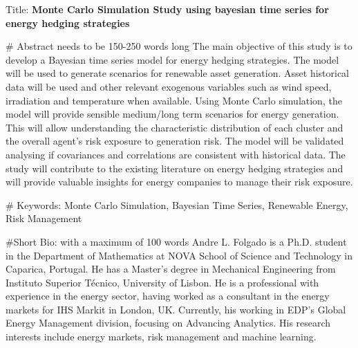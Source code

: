 \documentclass[11pt]{article}
\begin{document}
Title: \textbf{Monte Carlo Simulation Study using bayesian time series for energy hedging strategies}

# Abstract needs to be 150-250 words long
    The main objective of this study is to develop a Bayesian time series model for energy hedging strategies.
    The model will be used to generate scenarios for renewable asset generation.
    Asset historical data will be used and other relevant exogenous variables such as wind speed, irradiation and temperature when available.
    Using Monte Carlo simulation, the model will provide sensible medium/long term scenarios for energy generation.
    This will allow understanding the characteristic distribution of each cluster and the overall agent's risk exposure to generation risk.
    The model will be validated analysing if covariances and correlations are consistent with historical data.
    The study will contribute to the existing literature on energy hedging strategies and will provide valuable insights for energy companies to manage their risk exposure.

# Keywords: Monte Carlo Simulation, Bayesian Time Series, Renewable Energy, Risk Management

#Short Bio: with a maximum of 100 words
    Andre L. Folgado is a Ph.D. student in the Department of Mathematics at NOVA School of Science and Technology in Caparica, Portugal.
    He has a Master's degree in Mechanical Engineering from Instituto Superior Técnico, University of Lisbon.
    He is a professional with experience in the energy sector, having worked as a consultant in the energy markets for IHS Markit in London, UK.
    Currently, his working in EDP's Global Energy Management division, focusing on Advancing Analytics.
    His research interests include energy markets, risk management and machine learning.
\end{document}
